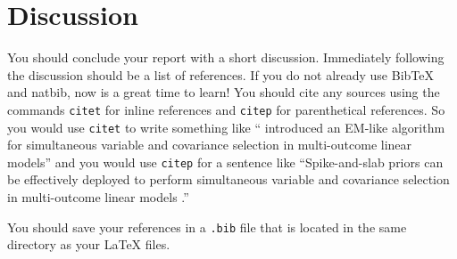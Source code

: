 \documentclass[12pt, twoside]{article}
\begin{document}
\section{Discussion}
You should conclude your report with a short discussion.
Immediately following the discussion should be a list of references.
If you do not already use BibTeX and natbib, now is a great time to learn!
You should cite any sources using the commands \texttt{citet} for inline references and \texttt{citep} for parenthetical references. 
So you would use \texttt{citet} to write something like ``\citet{Deshpande2019_mSSL} introduced an EM-like algorithm for simultaneous variable and covariance selection in multi-outcome linear models'' and you would use \texttt{citep} for a sentence like ``Spike-and-slab priors can be effectively deployed to perform simultaneous variable and covariance selection in multi-outcome linear models \citep{Deshpande2019_mSSL}.''

You should save your references in a \texttt{.bib} file that is located in the same directory as your LaTeX files.


\end{document}
